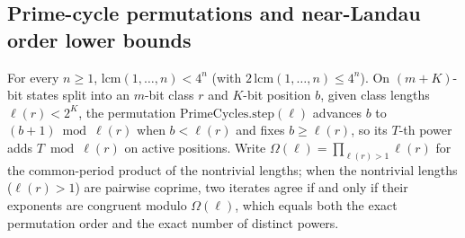 \begin{result}
\subsection{Prime-cycle permutations and near-Landau order lower bounds}
For every $n\ge 1$, $\mathrm{lcm}(1,\dots,n)<4^n$ (with $2\,\mathrm{lcm}(1,\dots,n)\le 4^n$).
On $(m+K)$-bit states split into an $m$-bit class $r$ and $K$-bit position $b$, given class lengths
$\ell(r)<2^K$, the permutation $\mathrm{PrimeCycles.step}(\ell)$ advances $b$ to $(b+1)\bmod\ell(r)$
when $b<\ell(r)$ and fixes $b\ge\ell(r)$, so its $T$-th power adds $T\bmod\ell(r)$ on active
positions. Write $\Omega(\ell)=\prod_{\ell(r)>1}\ell(r)$ for the common-period product of the
nontrivial lengths; when the nontrivial lengths ($\ell(r)>1$) are pairwise coprime, two iterates
agree if and only if their exponents are congruent modulo $\Omega(\ell)$, which equals both the exact
permutation order and the exact number of distinct powers.


\end{result}
